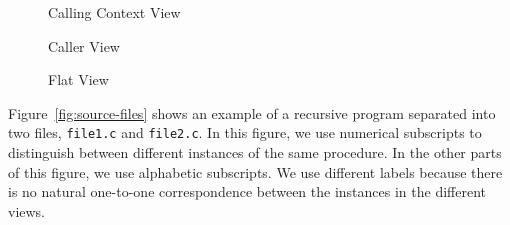 \begin{figure}[t]
\caption{Calling Context View}
\label{fig:cct}
\end{figure}

\begin{figure}
\caption{Caller View}
\label{fig:metrics-callers}
\end{figure}

\begin{figure}
\caption{Flat View}
\label{fig:metrics-flat}
\end{figure}


Figure~\ref{fig:source-files} shows an example of a recursive program separated into two files, \texttt{file1.c} and \texttt{file2.c}.
In this figure, we use numerical subscripts to distinguish between different instances of the same procedure.
In the other parts of this figure, we use alphabetic subscripts.
We use different labels because there is no natural one-to-one correspondence between the instances in the different views.

